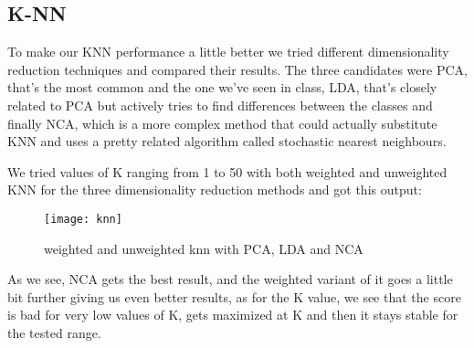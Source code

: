 
\subsection{K-NN}%
\label{sub:knn}
To make our KNN performance a little better we tried different dimensionality reduction techniques and compared their results.
The three candidates were PCA, that's the most common and the one we've seen in class, LDA, that's closely related to PCA but actively tries to find differences between the classes and finally NCA, which is a more complex method that could actually substitute KNN and uses a pretty related algorithm called stochastic nearest neighbours.

We tried values of K ranging from 1 to 50 with both weighted and unweighted KNN for the three dimensionality reduction methods and got this output:
\begin{figure}[H]
    \centering
    \texttt{[image: knn]}
    \caption{weighted and unweighted knn with PCA, LDA and NCA}%
    \label{fig:knn_pca_lda_nca}
\end{figure}


As we see, NCA gets the best result, and the weighted variant of it goes a little bit further giving us even better results, as for the K value, we see that the score is bad for very low values of K, gets maximized at K and then it stays stable for the tested range.

